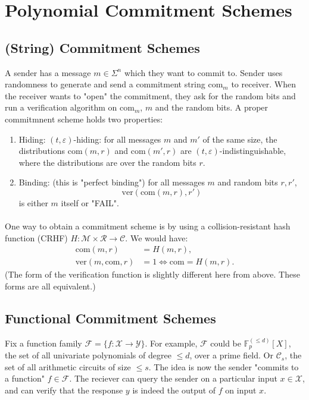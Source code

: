 \documentclass[11pt]{article}
\begin{document}
\section{Polynomial Commitment Schemes}

\subsection{(String) Commitment Schemes} A sender has a message $m \in \Sigma^n$ which they want to commit to. Sender uses randomness to generate and send a commitment string $\text{com}_m$ to receiver. When the receiver wants to "open" the commitment, they ask for the random bits and run a verification algorithm on $\text{com}_m$, $m$ and the random bits. A proper commitmnent scheme holds two properties:
\begin{enumerate}
    \item Hiding: $(t, \varepsilon)$-hiding: for all messages $m$ and $m'$ of the same size, the distributions $\text{com}(m, r)$ and $\text{com}(m', r)$ are $(t, \varepsilon)$-indistinguishable, where the distributions are over the random bits $r$.
    \item Binding: (this is "perfect binding") for all messages $m$ and random bits $r, r'$, 
    \[\text{ver}(\text{com}(m, r), r')\]
    is either $m$ itself or "FAIL".
\end{enumerate}

\paragraph{} One way to obtain a commitment scheme is by using a collision-resistant hash function (CRHF) $H: \mathcal{M} \times \mathcal{R} \rightarrow \mathcal{C}$. We would have:
\begin{align*}
    \text{com}(m, r) &= H(m, r), \\
    \text{ver}(m, \text{com}, r)  &= 1 \Longleftrightarrow \text{com} = H(m, r).
\end{align*}
(The form of the verification function is slightly different here from above. These forms are all equivalent.)

\subsection{Functional Commitment Schemes} Fix a function family $\mathcal{F} = \{f: \mathcal{X} \rightarrow \mathcal{Y}\}$. For example, $\mathcal{F}$ could be $\mathbb{F}_p^{(\leq d)} [X]$, the set of all univariate polynomials of degree $\leq d$, over a prime field. Or $\mathcal{C}_s$, the set of all arithmetic circuits of size $\leq s$. The idea is now the sender "commits to a function" $f \in \mathcal{F}$. The reciever can query the sender on a particular input $x \in \mathcal{X}$, and can verify that the response $y$ is indeed the output of $f$ on input $x$.
\end{document}
